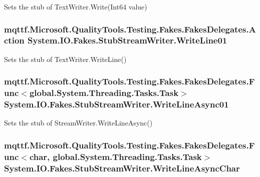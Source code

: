 Sets the stub of Text\-Writer.\-Write(\-Int64 value)

\hypertarget{class_system_1_1_i_o_1_1_fakes_1_1_stub_stream_writer_af63b422507340537e48c4725fc003bfd}{
\subsubsection[{Write\-Line01}]{\setlength{\rightskip}{0pt plus 5cm}mqttf.\-Microsoft.\-Quality\-Tools.\-Testing.\-Fakes.\-Fakes\-Delegates.\-Action System.\-I\-O.\-Fakes.\-Stub\-Stream\-Writer.\-Write\-Line01}}\label{class_system_1_1_i_o_1_1_fakes_1_1_stub_stream_writer_af63b422507340537e48c4725fc003bfd}


Sets the stub of Text\-Writer.\-Write\-Line()

\hypertarget{class_system_1_1_i_o_1_1_fakes_1_1_stub_stream_writer_af6b14b5f06428bd4406e493b9b83dae7}{
\subsubsection[{Write\-Line\-Async01}]{\setlength{\rightskip}{0pt plus 5cm}mqttf.\-Microsoft.\-Quality\-Tools.\-Testing.\-Fakes.\-Fakes\-Delegates.\-Func$<$global.\-System.\-Threading.\-Tasks.\-Task$>$ System.\-I\-O.\-Fakes.\-Stub\-Stream\-Writer.\-Write\-Line\-Async01}}\label{class_system_1_1_i_o_1_1_fakes_1_1_stub_stream_writer_af6b14b5f06428bd4406e493b9b83dae7}


Sets the stub of Stream\-Writer.\-Write\-Line\-Async()

\hypertarget{class_system_1_1_i_o_1_1_fakes_1_1_stub_stream_writer_ac06eae1f98b30428b9dc8d276f8c08d8}{
\subsubsection[{Write\-Line\-Async\-Char}]{\setlength{\rightskip}{0pt plus 5cm}mqttf.\-Microsoft.\-Quality\-Tools.\-Testing.\-Fakes.\-Fakes\-Delegates.\-Func$<$char, global.\-System.\-Threading.\-Tasks.\-Task$>$ System.\-I\-O.\-Fakes.\-Stub\-Stream\-Writer.\-Write\-Line\-Async\-Char}}\label{class_system_1_1_i_o_1_1_fakes_1_1_stub_stream_writer_ac06eae1f98b30428b9dc8d276f8c08d8}


